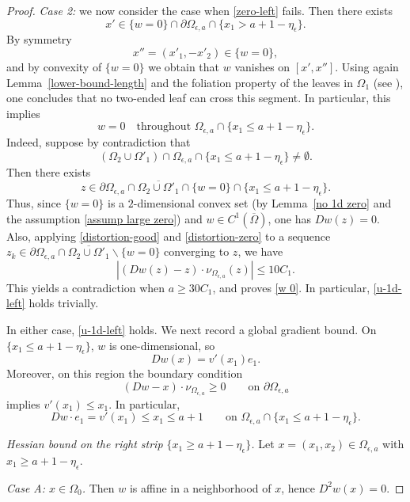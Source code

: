 \documentclass[reqno,11pt]{amsart}
\numberwithin{equation}{section}
\theoremstyle{remark}
\begin{document}
\begin{proof}
\smallskip
\noindent\emph{Case 2:} we now consider the case when \eqref{zero-left} fails.
Then there exists
\begin{equation}\label{assump large zero}
x'\in\{w=0\}\cap\partial\Omega_{\epsilon,a}\cap\{x_1>a+1-\eta_\epsilon\}.
\end{equation}
By symmetry
\[
x''=(x'_1,-x'_2)\in\{w=0\},
\]
and by convexity of $\{w=0\}$ we obtain that $w$ vanishes on $[x',x'']$.
Using again Lemma~\ref{lower-bound-length} and the foliation property of the leaves in $\Omega_{1}$ (see \cite{MRZ20252}), one concludes that no two-ended leaf can cross this segment. In particular, this implies
\begin{equation}\label{w 0}
    w=0 \quad \text{throughout } \Omega_{\epsilon,a}\cap\{x_1\le a+1-\eta_\epsilon\}.
\end{equation}
Indeed, suppose by contradiction that
\[
(\Omega_2\cup\Omega'_1)\cap \Omega_{\epsilon,a}\cap\{x_1\le a+1-\eta_\epsilon\}\neq \emptyset.
\]
Then there exists
\[
z\in \partial\Omega_{\epsilon,a}\cap \overline{\Omega_2\cup\Omega'_1}\cap \{w=0\}\cap\{x_1\le a+1-\eta_\epsilon\}.
\]
Thus, since $\{w=0\}$ is a $2$-dimensional convex set (by Lemma~\ref{no 1d zero} and the assumption \eqref{assump large zero}) and $w\in C^1(\overline{\Omega})$, one has $Dw(z)=0$.
Also, applying \eqref{distortion-good} and \eqref{distortion-zero} to a sequence $z_k\in \partial\Omega_{\epsilon,a}\cap \overline{\Omega_2\cup\Omega'_1}\backslash\{w=0\}$ converging to $z$, we have 
\[
|(Dw(z)-z)\cdot \nu_{\Omega_{\epsilon,a}}(z)|\le 10 C_1.
\]
This yields a contradiction when $a\ge 30C_1$, and proves \eqref{w 0}.
In particular, \eqref{u-1d-left} holds trivially.

\smallskip
In either case, \eqref{u-1d-left} holds.
We next record a global gradient bound.
On $\{x_1\le a+1-\eta_\epsilon\}$, $w$ is one-dimensional, so
\[
Dw(x)=v'(x_1)e_1.
\]
Moreover, on this region the boundary condition
\[
(Dw-x)\cdot\nu_{\Omega_{\epsilon,a}}\ge0
\qquad\text{on }\partial\Omega_{\epsilon,a}
\]
implies $v'(x_1)\le x_1$.
In particular,
\[
Dw\cdot e_1=v'(x_1)\le x_1\le a+1
\qquad\text{on }\Omega_{\epsilon,a}\cap\{x_1\le a+1-\eta_\epsilon\}.
\]

\smallskip
\noindent\emph{Hessian bound on the right strip $\{x_1\ge a+1-\eta_\epsilon\}$.}
Let $x=(x_1,x_2)\in \Omega_{\epsilon,a}$ with $x_1\ge a+1-\eta_\epsilon$.

\smallskip
\noindent\emph{Case A: $x\in\Omega_{0}$.}
Then $w$ is affine in a neighborhood of $x$, hence $D^2w(x)=0$.


\end{proof}
\end{document}
